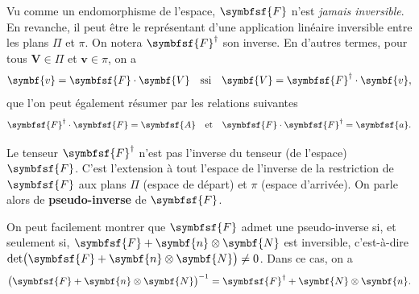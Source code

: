 \documentclass[
  a4paper,
  DIV=11,
  numbers=noendperiod]{scrreprt}
\newcommand{\tens}[1]{\symbfsf{#1}}
\renewcommand{\vec}[1]{\symbf{#1}}
\begin{document}
Vu comme un endomorphisme de l'espace, \(\tens{F}\) n'est \emph{jamais
inversible}. En revanche, il peut être le représentant d'une application
linéaire inversible entre les plans \(\Pi\) et \(\pi\). On notera
\(\tens F^\dagger\) son inverse. En d'autres termes, pour tous
\(\vec{V} \in \Pi\) et \(\vec{v} \in \pi\), on a \[
\vec{v} = \tens{F} \cdot \vec{V} \quad \text{ssi} \quad \vec{V} = \tens{F}^\dagger \cdot \vec{v},
\] que l'on peut également résumer par les relations suivantes \[
\tens{F}^\dagger \cdot \tens{F} = \tens{A} \quad \text{et} \quad \tens{F} \cdot \tens{F}^\dagger = \tens{a}.
\]

\begin{tcolorbox}[enhanced jigsaw, toprule=.15mm, breakable, left=2mm, rightrule=.15mm, colbacktitle=quarto-callout-note-color!10!white, colframe=quarto-callout-note-color-frame, title=\textcolor{quarto-callout-note-color}{\faInfo}\hspace{0.5em}{Note}, bottomtitle=1mm, arc=.35mm, coltitle=black, opacityback=0, leftrule=.75mm, titlerule=0mm, toptitle=1mm, bottomrule=.15mm, opacitybacktitle=0.6, colback=white]

Le tenseur \(\tens{F}^\dagger\) n'est pas l'inverse du tenseur (de
l'espace) \(\tens{F}\). C'est l'extension à tout l'espace de l'inverse
de la restriction de \(\tens{F}\) aux plans \(\Pi\) (espace de départ)
et \(\pi\) (espace d'arrivée). On parle alors de
\textbf{pseudo-inverse}\footnotemark{} de \(\tens{F}\).

On peut facilement montrer que \(\tens{F}\) admet une pseudo-inverse si,
et seulement si, \(\tens{F} + \vec{n} \otimes \vec{N}\) est inversible,
c'est-à-dire
\(\det\bigl( \tens F + \vec n \otimes \vec N \bigr) \neq 0\). Dans ce
cas, on a \[
\bigl( \tens{F} + \vec{n} \otimes \vec{N} \bigr)^{-1} = \tens{F}^\dagger + \vec{N} \otimes \vec{n}.
\]

\end{tcolorbox}

\end{document}
